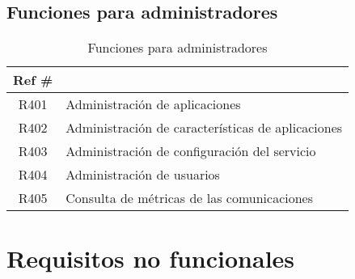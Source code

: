 \subsection{Funciones para administradores}

\begin{table}[ht]
    \centering
    \begin{tabularx}{\textwidth}{|cX|}
    \rowcolor[HTML]{9B9B9B} 
    {\color[HTML]{FFFFFF} Ref \#} &
      \multicolumn{1}{l}{\cellcolor[HTML]{9B9B9B}{\color[HTML]{FFFFFF} Función}} \\ \hline
    R401\label{R401} & Administración de aplicaciones \\
    R402\label{R402} & Administración de características de aplicaciones \\
    R403\label{R403} & Administración de configuración del servicio \\
    R404\label{R404} & Administración de usuarios \\ 
    R405\label{R405} & Consulta de métricas de las comunicaciones \\ 
    \hline
    \end{tabularx}
    \caption{Funciones para administradores}
    \label{cuadro:funciones-administradores}
\end{table}

\section{Requisitos no funcionales}